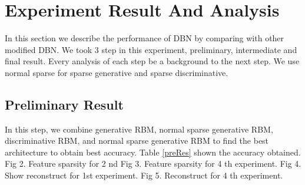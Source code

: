 \documentclass[conference]{IEEEtran}
\begin{document}
\section{Experiment Result And Analysis}
In this section we describe the performance of DBN by
comparing with other modified DBN. We took 3 step in this
experiment, preliminary, intermediate and final result. Every
analysis of each step be a background to the next step. We use
normal sparse for sparse generative and sparse discriminative.
\subsection{Preliminary Result}
In this step, we combine generative RBM, normal sparse
generative RBM, discriminative RBM, and normal sparse
generative RBM to find the best architecture to obtain best
accuracy. Table \ref{preRes} shown the accuracy obtained. Fig 2. Feature
sparsity for 2 nd Fig 3. Feature sparsity for 4 th experiment. Fig
4. Show reconstruct for 1st experiment. Fig 5. Reconstruct for
4 th experiment.
\end{document}
